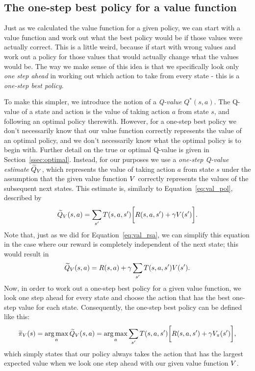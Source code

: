 \documentclass[a4paper]{article}
\begin{document}
\subsection{The one-step best policy for a value function} \label{ssec:one_step}
Just as we calculated the value function for a given policy,
we can start with a value function and work out what the best
policy would be if those values were actually correct.
This is a little weird, because if start with wrong values
and work out a policy for those values that would actually
change what the values would be.
The way we make sense of this idea is that we specifically look
only \emph{one step ahead} in working out which action to take
from every state - this is a \emph{one-step best policy}.

To make this simpler, we introduce the notion of a \emph{Q-value} $Q^*(s, a)$.
The Q-value of a state and action is the value of taking action $a$ from
state $s$, and following an optimal policy therewith.
However, for a one-step best policy we don't necessarily know that our value
function correctly represents the value of an optimal policy,
and we don't necessarily know what the optimal policy is to begin with.
Further detail on the true or optimal Q-value is given in
Section~\ref{ssec:optimal}.
Instead, for our purposes we use a \emph{one-step Q-value estimate}
$\widetilde{Q}_V$,
which represents the value of taking action $a$ from state $s$ under the
assumption that the given value function $V$ correctly represents the values
of the subsequent next states.
This estimate is, similarly to Equation~\ref{eq:val_pol}, described by
\begin{equation} \label{eq:q_est}
  \widetilde{Q}_V(s, a) =  \sum_{s'} T(s, a, s') \bigg[ R(s, a, s') + \gamma V(s') \bigg] .
\end{equation}
Note that, just as we did for Equation~\ref{eq:val_rsa}, we can simplify this equation in
the case where our reward is completely independent of the next state;
this would result in
\begin{equation} \label{eq:q_est_rsa}
  \widetilde{Q}_V(s, a) =  R(s, a) + \gamma \sum_{s'} T(s, a, s') V(s') .
\end{equation}
Now, in order to work out a one-step best policy for a given value function,
we look one step ahead for every state and choose the action that has the
best one-step value for each state.
Consequently, the one-step best policy can be defined like this:
\begin{equation} \label{eq:one_step_pol}
  \widetilde{\pi}_V(s) = \operatorname*{arg\,max}_a \widetilde{Q}_V(s, a) = \operatorname*{arg\,max}_a \sum_{s'} T(s, a, s') \bigg[ R(s, a, s') + \gamma V_\pi(s') \bigg] ,
\end{equation}
which simply states that our policy always takes the action that has the largest
expected value when we look one step ahead with our given value function $V$.
\end{document}
